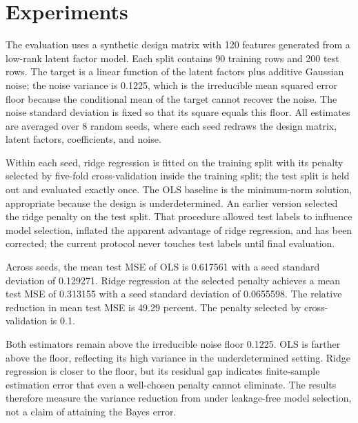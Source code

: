 \section{Experiments}

The evaluation uses a synthetic design matrix with 120 features generated from a low-rank latent factor model. Each split contains 90 training rows and 200 test rows. The target is a linear function of the latent factors plus additive Gaussian noise; the noise variance is 0.1225, which is the irreducible mean squared error floor because the conditional mean of the target cannot recover the noise. The noise standard deviation is fixed so that its square equals this floor. All estimates are averaged over 8 random seeds, where each seed redraws the design matrix, latent factors, coefficients, and noise.

Within each seed, ridge regression \citep{hoerl1970ridge} is fitted on the training split with its penalty selected by five-fold cross-validation inside the training split; the test split is held out and evaluated exactly once. The OLS baseline is the minimum-norm solution, appropriate because the design is underdetermined. An earlier version selected the ridge penalty on the test split. That procedure allowed test labels to influence model selection, inflated the apparent advantage of ridge regression, and has been corrected; the current protocol never touches test labels until final evaluation.

Across seeds, the mean test MSE of OLS is 0.617561 with a seed standard deviation of 0.129271. Ridge regression at the selected penalty achieves a mean test MSE of 0.313155 with a seed standard deviation of 0.0655598. The relative reduction in mean test MSE is 49.29 percent. The penalty selected by cross-validation is 0.1.

Both estimators remain above the irreducible noise floor 0.1225. OLS is farther above the floor, reflecting its high variance in the underdetermined setting. Ridge regression is closer to the floor, but its residual gap indicates finite-sample estimation error that even a well-chosen penalty cannot eliminate. The results therefore measure the variance reduction from \citep{hoerl1970ridge} under leakage-free model selection, not a claim of attaining the Bayes error.

